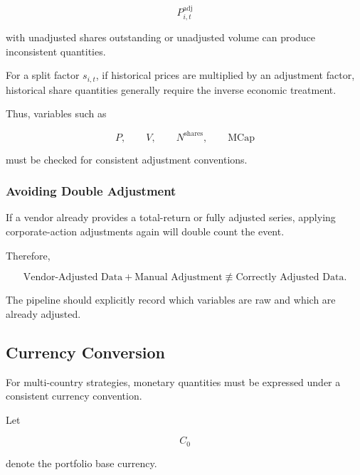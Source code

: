\documentclass[11pt,a4paper]{article}
\begin{document}
\begin{equation}
P_{i,t}^{\mathrm{adj}}
\end{equation}

with unadjusted shares outstanding or unadjusted volume can produce inconsistent
quantities.

For a split factor $s_{i,t}$, if historical prices are multiplied by an
adjustment factor, historical share quantities generally require the inverse
economic treatment.

Thus, variables such as

\begin{equation}
P,
\qquad
V,
\qquad
N^{\mathrm{shares}},
\qquad
\mathrm{MCap}
\end{equation}

must be checked for consistent adjustment conventions.


\subsubsection{Avoiding Double Adjustment}

If a vendor already provides a total-return or fully adjusted series, applying
corporate-action adjustments again will double count the event.

Therefore,

\begin{equation}
\boxed{
\text{Vendor-Adjusted Data}
+
\text{Manual Adjustment}
\not\equiv
\text{Correctly Adjusted Data}.
}
\end{equation}

The pipeline should explicitly record which variables are raw and which are
already adjusted.


\subsection{Currency Conversion}
\label{subsec:currency_conversion_cleaning}

For multi-country strategies, monetary quantities must be expressed under a
consistent currency convention.

Let

\begin{equation}
C_0
\end{equation}

denote the portfolio base currency.
\end{document}
